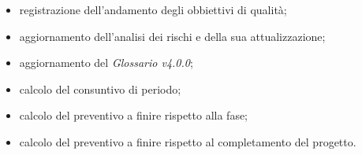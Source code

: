 \begin{itemize}
\begin{itemize}
              \item registrazione dell'andamento degli obbiettivi di qualità;
              \item aggiornamento dell'analisi dei rischi e della sua attualizzazione;
              \item aggiornamento del \textit{Glossario v4.0.0};
              \item calcolo del consuntivo di periodo;
              \item calcolo del preventivo a finire rispetto alla fase;
              \item calcolo del preventivo a finire rispetto al completamento del progetto.
          \end{itemize}
\end{itemize}


